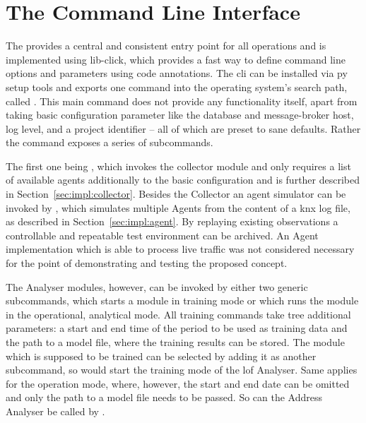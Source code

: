 \section{The Command Line Interface}
\label{sec:impl:cli}

\begin{comment}
\begin{itemize}
	\item central entry point for all operations
	\item consistent user experience -> less fiddling while debugging/developing
	\item centralises configuration and log setup
	\item can be easily made accessible via python setuptools
		\subitem if globally installed, callable via normal terminal command
	\item implemented using the \gls{lib-click} library version 6
\end{itemize}
\end{comment}

The  provides a central and consistent entry point for all operations and is implemented using \gls{lib-click}, which provides a fast way to define command line options and parameters using code annotations.
The \gls{cli} can be installed via \gls{py} setup tools and exports one command into the operating system's search path, called .
This main command does not provide any functionality itself, apart from taking basic configuration parameter like the database and message-broker host, log level, and a project identifier -- all of which are preset to sane defaults.
Rather the command exposes a series of subcommands.

The first one being , which invokes the collector module and only requires a list of available agents additionally to the basic configuration and is further described in Section~\ref{sec:impl:collector}.
Besides the Collector an agent simulator can be invoked by , which simulates multiple Agents from the content of a \gls{knx} log file, as described in Section~\ref{sec:impl:agent}.
By replaying existing observations a controllable and repeatable test environment can be archived. An Agent implementation which is able to process live traffic was not considered necessary for the point of demonstrating and testing the proposed concept.

The Analyser modules, however, can be invoked by either two generic subcommands,  which starts a module in training mode or  which runs the module in the operational, analytical mode.
All training commands take tree additional parameters: a start and end time of the period to be used as training data and the path to a model file, where the training results can be stored. The module which is supposed to be trained can be selected by adding it as another subcommand, so would  start the training mode of the \gls{lof} Analyser.
Same applies for the operation mode, where, however, the start and end date can be omitted and only the path to a model file needs to be passed. So can the Address Analyser be called by .

